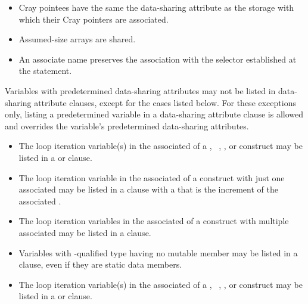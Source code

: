 {{{{\begin{itemize}
\item Cray pointees have the same the data-sharing attribute as the storage with which their Cray 
pointers are associated.

\item Assumed-size arrays are shared.
\nopagebreak
\item An associate name preserves the association with the selector established at the 
 statement.
\end{itemize}
\fortranspecificend

Variables with predetermined data-sharing attributes may not be listed in data-sharing 
attribute clauses, except for the cases listed below. For these exceptions only, listing a 
predetermined variable in a data-sharing attribute clause is allowed and overrides the 
variable's predetermined data-sharing attributes.

\ccppspecificstart
\begin{itemize}
\item The loop iteration variable(s) in the associated  of a , 
~, , or  construct may be listed in a  or  clause.

\item The loop iteration variable in the associated  of a  construct with just 
one associated  may be listed in a  clause with a
that is the increment of the associated .

\item The loop iteration variables in the associated  of a  construct with 
multiple associated  may be listed in a  clause. 

\item Variables with -qualified type having no mutable member may be listed in a
 clause, even if they are static data members.
\end{itemize}
\ccppspecificend

\fortranspecificstart
\begin{itemize}
\item The loop iteration variable(s) in the associated  of a , 
~, , or 
construct may be listed in a  or  clause. 


\end{itemize}}}}}
